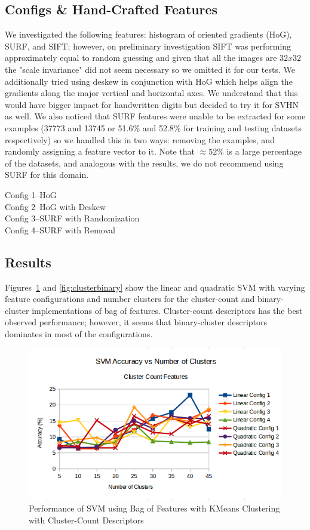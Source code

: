 \documentclass{article} %
\begin{document}
\subsection{Configs \& Hand-Crafted Features}
We investigated the following features: histogram of oriented gradients (HoG), SURF, and SIFT; however, on preliminary investigation SIFT was performing approximately equal to random guessing and given that all the images are $32x32$ the "scale invariance" did not seem necessary so we omitted it for our tests.  We additionally tried using deskew in conjunction with HoG which helps align the gradients along the major vertical and horizontal axes.  We understand that this would have bigger impact for handwritten digits \cite{handwrittendigits} but decided to try it for SVHN as well.  We also noticed that SURF features were unable to be extracted for some examples (37773 and 13745 or 51.6\% and 52.8\% for training and testing datasets respectively) so we handled this in two ways: removing the examples, and randomly assigning a feature vector to it.  Note that $\approx 52\%$ is a large percentage of the datasets, and analogous with the results, we do not recommend using SURF for this domain.

Config 1--HoG\\
Config 2--HoG with Deskew\\
Config 3--SURF with Randomization\\
Config 4--SURF with Removal\\

\subsection{Results}
Figures~\ref{fig:clustercount} and \ref{fig:clusterbinary} show the linear and quadratic SVM with varying feature configurations and number clusters for the cluster-count and binary-cluster implementations of bag of features. Cluster-count descriptors has the best observed performance; however, it seems that binary-cluster descriptors dominates in most of the configurations.

\begin{figure}
\centering
	\includegraphics[width=0.8\linewidth]{./plots/svm/clustercount}
    	\caption{Performance of SVM using Bag of Features with KMeans Clustering with Cluster-Count Descriptors}
	\label{fig:clustercount}
\end{figure}
\end{document}

